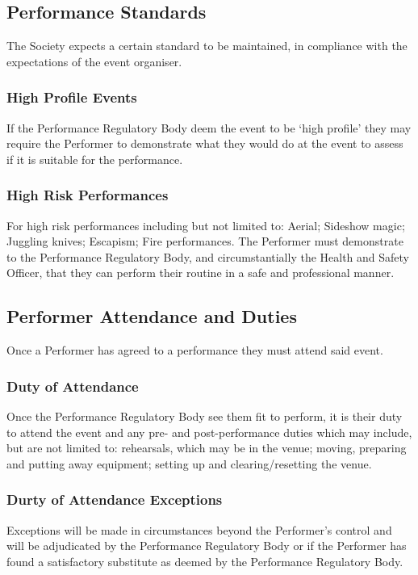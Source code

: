 \documentclass[11pt,a4paper]{article}
\begin{document}
\subsection{Performance Standards}
The Society expects a certain standard to be maintained, in compliance with the expectations of the event organiser.

\subsubsection{High Profile Events}
If the Performance Regulatory Body deem the event to be `high profile' they may require the Performer to demonstrate what they would do at the event to assess if it is suitable for the performance.

\subsubsection{High Risk Performances}
For high risk performances including but not limited to: Aerial; Sideshow magic; Juggling knives; Escapism; Fire performances. The Performer must demonstrate to the Performance Regulatory Body, and circumstantially the Health and Safety Officer, that they can perform their routine in a safe and professional manner.

\subsection{Performer Attendance and Duties}
Once a Performer has agreed to a performance they must attend said event.

\subsubsection{Duty of Attendance}
Once the Performance Regulatory Body see them fit to perform, it is their duty to attend the event and any pre- and post-performance duties which may include, but are not limited to: rehearsals, which may be in the venue; moving, preparing and putting away equipment; setting up and clearing/resetting the venue.

\subsubsection{Durty of Attendance Exceptions}
Exceptions will be made in circumstances beyond the Performer's control and will be adjudicated by the Performance Regulatory Body or if the Performer has found a satisfactory substitute as deemed by the Performance Regulatory Body.
\end{document}
